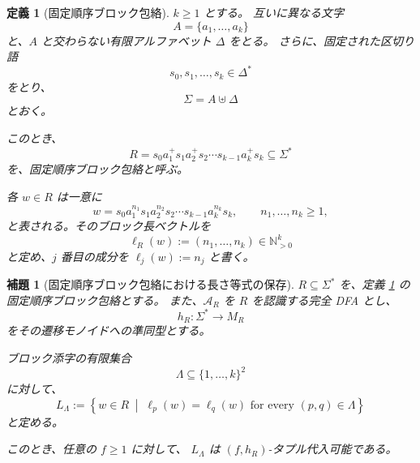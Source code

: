 \documentclass[11pt,a4paper]{ltjsarticle}
\newtheorem{lemma}[theorem]{補題}
\newtheorem{definition}[theorem]{定義}
\theoremstyle{remark}
\begin{document}
\begin{definition}[固定順序ブロック包絡]
\label{def:fixed-ordered-block-envelope}
\(k\ge 1\) とする。
互いに異なる文字
\[
  A=\{a_1,\ldots,a_k\}
\]
と、\(A\) と交わらない有限アルファベット \(\Delta\) をとる。
さらに、固定された区切り語
\[
  s_0,s_1,\ldots,s_k\in\Delta^*
\]
をとり、
\[
  \Sigma=A\uplus\Delta
\]
とおく。

このとき、
\[
  R
  =
  s_0a_1^+s_1a_2^+s_2\cdots s_{k-1}a_k^+s_k
  \subseteq\Sigma^*
\]
を、\emph{固定順序ブロック包絡}と呼ぶ。

各 \(w\in R\) は一意に
\[
  w
  =
  s_0a_1^{n_1}s_1a_2^{n_2}s_2
  \cdots
  s_{k-1}a_k^{n_k}s_k,
  \qquad
  n_1,\ldots,n_k\ge1,
\]
と表される。そのブロック長ベクトルを
\[
  \ell_R(w)
  :=
  (n_1,\ldots,n_k)
  \in\mathbb{N}_{>0}^k
\]
と定め、\(j\) 番目の成分を \(\ell_j(w):=n_j\) と書く。
\end{definition}

\begin{lemma}[固定順序ブロック包絡における長さ等式の保存]
\label{lem:block-equality-envelopes}
\(R\subseteq\Sigma^*\) を、定義
\ref{def:fixed-ordered-block-envelope}
の固定順序ブロック包絡とする。
また、\(\mathcal A_R\) を \(R\) を認識する完全 DFA とし、
\[
  h_R:\Sigma^*\longrightarrow M_R
\]
をその遷移モノイドへの準同型とする。

ブロック添字の有限集合
\[
  \Lambda\subseteq\{1,\ldots,k\}^2
\]
に対して、
\[
  L_\Lambda
  :=
  \left\{
    w\in R
    \;\middle|\;
    \ell_p(w)=\ell_q(w)
    \text{ for every }(p,q)\in\Lambda
  \right\}
\]
と定める。

このとき、任意の \(f\ge1\) に対して、
\(L_\Lambda\) は \((f,h_R)\)-タプル代入可能である。
\end{lemma}
\end{document}
